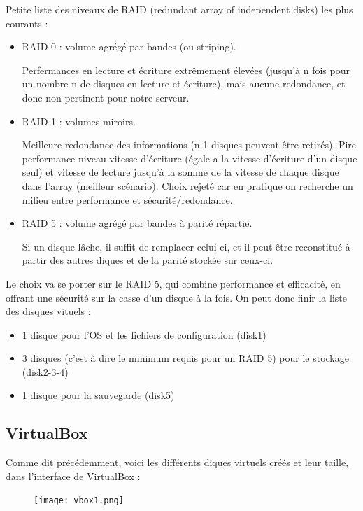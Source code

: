 \documentclass{article}
\begin{document}
	Petite liste des niveaux de RAID (redundant array of independent disks) les plus courants :
	\begin{itemize}
	\item RAID 0 : volume agrégé par bandes (ou striping).
	
	Perfermances en lecture et écriture extrêmement élevées (jusqu'à n fois pour un nombre n de disques en lecture et écriture), mais aucune redondance, et donc non pertinent pour notre serveur.
	\item RAID 1 : volumes miroirs. 
	
	Meilleure redondance des informations (n-1 disques peuvent être retirés). Pire performance niveau vitesse d'écriture (égale a la vitesse d'écriture d'un disque seul) et vitesse de lecture jusqu'à la somme de la vitesse de chaque disque dans l'array (meilleur scénario). Choix rejeté car en pratique on recherche un milieu entre performance et sécurité/redondance.

	\item RAID 5 : volume agrégé par bandes à parité répartie.

	Si un disque lâche, il suffit de remplacer celui-ci, et il peut être reconstitué à partir des autres diques et de la parité stockée sur ceux-ci.

	\end{itemize}

Le choix va se porter sur le RAID 5, qui combine performance et efficacité, en offrant une sécurité sur la casse d'un disque à la fois. On peut donc finir la liste des disques vituels :
\begin{itemize}
\item 1 disque pour l'OS et les fichiers de configuration (disk1)
\item 3 disques (c'est à dire le minimum requis pour un RAID 5) pour le stockage (disk2-3-4)
\item 1 disque pour la sauvegarde (disk5)
\end{itemize}

\newpage

\subsection{VirtualBox}

Comme dit précédemment, voici les différents diques virtuels créés et leur taille, dans l'interface de VirtualBox :

\begin{figure}[h!]
		\centering
		\texttt{[image: vbox1.png]}
\end{figure}
\end{document}
